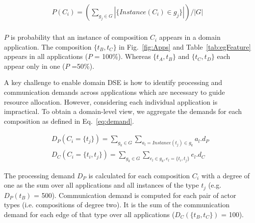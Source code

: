 \begin{equation}
\begin{split}
\label{eq:p}
P(C_i) = (\sum_{g_j \in G} \left\vert \{ Instance(C_i) \in g_j \} \right\vert) / \left\vert{G}\right\vert \\
\end{split}
\end{equation}


$P$ is probability that an instance of composition $C_i$ appears in a domain application. The composition $\{t_{B}, t_{C}\}$ in Fig.~\ref{fig:Apps} and Table~\ref{tab:egFeature} appears in all applications ($P$ = 100\%). Whereas $\{t_A, t_B\}$ and $\{t_C, t_D\}$ each appear only in one ($P$ =50\%).  

A key challenge to enable domain DSE is how to identify processing and communication demands across applications which are necessary to guide resource allocation. However, considering each individual application is impractical. To obtain a domain-level view, we aggregate the demands for each composition as defined in Eq.~\eqref{eq:demand}.

\begin{equation}
\begin{split}
\label{eq:demand}
	&D_P(C_i=\{t_j\}) = \sum_{g_k \in G} \sum_{ a_l = Instance(t_j) \in g_k} a_l.d_P\\
	&D_C(C_i=\{t_i, t_j\}) = \sum_{g_k \in G} \sum_{e_l \in g_k, e_l=\{t_i,t_j\}} e_l.d_C
\end{split}
\end{equation}


The processing demand $D_P$ is calculated for each composition $C_i$ with a degree of one as the sum over all applications and all instances of the type $t_j$ (e.g. $D_P(t_B)$ = 500). Communication demand is computed for each pair of actor types (i.e. compositions of degree two). It is the sum of the communication demand for each edge of that type over all applications ($D_C(\{t_B, t_C\})$ = 100). 

